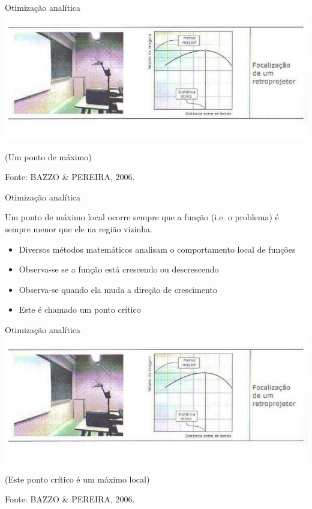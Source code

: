 \documentclass{beamer}
\begin{document}
\begin{frame}{Otimização analítica}
  \centering
  \includegraphics[width=1.1\textwidth]{otimizacao/1var}

(Um ponto de máximo)

\vfill
Fonte: BAZZO \& PEREIRA, 2006.
\end{frame}

\begin{frame}{Otimização analítica}
  \begin{block}{}
    Um ponto de máximo local ocorre sempre que a função (i.e. o problema) é sempre menor que ele na região vizinha.
  \end{block}

  \begin{itemize}
  \item Diversos métodos matemáticos analisam o comportamento local de funções
  \item Observa-se se a função está crescendo ou descrescendo
  \item Observa-se quando ela \alert{muda} a direção de crescimento
  \item Este é chamado um \alert{ponto crítico}
  \end{itemize}
\end{frame}

\begin{frame}{Otimização analítica}
  \centering
  \includegraphics[width=1.1\textwidth]{otimizacao/1var}

(Este ponto crítico é um máximo local)

\vfill
Fonte: BAZZO \& PEREIRA, 2006.
\end{frame}
\end{document}
